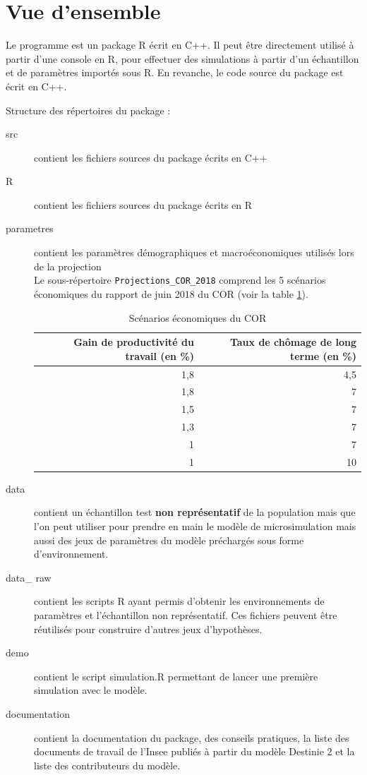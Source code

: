 \section{Vue d'ensemble}

Le programme est un package R écrit en C++. Il peut
être directement utilisé à partir d'une console en R, 
pour effectuer des simulations à partir d'un échantillon et de paramètres importés sous R. En revanche, le code source du package est écrit en C++. 

Structure des répertoires du package :

	\begin{description}
		\item[src] contient les fichiers sources du package écrits en C++
		\item[R] contient les fichiers sources du package écrits en R
		\item[parametres] contient les paramètres démographiques et macroéconomiques utilisés lors de la projection\\
Le sous-répertoire {\tt Projections\_COR\_2018} comprend les 5 scénarios économiques du rapport de juin 2018 du COR (voir la table \ref{tab:hypscCOR}). 
\renewcommand{\arraystretch}{1.8}

\begin{table}[h]
  \centering
  \caption{Scénarios économiques du COR}
    \begin{tabular}{rr}
    \toprule
 Gain de productivité du travail (en \%) & Taux de chômage de long terme (en \%) \\
    \midrule
 1,8     & 4,5 \\
 1,8   & 7 \\
 1,5   & 7 \\
 1,3   & 7 \\
 1     & 7 \\
 1     & 10 \\
    \bottomrule
    \end{tabular}%
  \label{tab:hypscCOR}%
\end{table}%
		\item[data] contient un échantillon test \textbf{non représentatif} de la population mais que l'on peut utiliser pour prendre en main le modèle de microsimulation mais aussi des jeux de paramètres du modèle préchargés sous forme d'environnement.
		\item[data\_ raw] contient les scripts R ayant permis d'obtenir les environnements de paramètres et l'échantillon non représentatif. Ces fichiers peuvent être réutilisés pour construire d'autres jeux d'hypothèses.
		\item[demo] contient le script simulation.R permettant de lancer une première simulation avec le modèle.
		\item[documentation] contient la documentation du package, des conseils pratiques, la liste des documents de travail de l'Insee publiés à partir du modèle Destinie 2 et la liste des contributeurs du modèle.
	\end{description}






